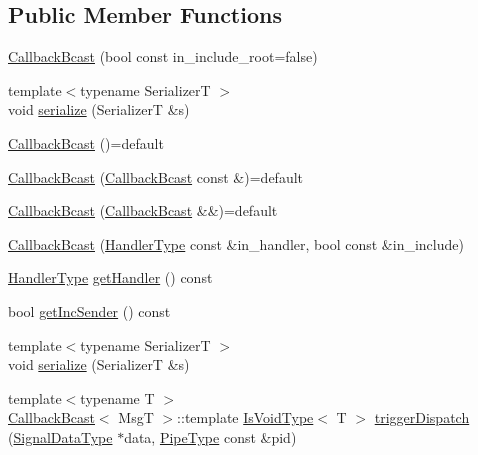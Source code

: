 \subsection*{Public Member Functions}
\begin{DoxyCompactItemize}
\item 
\hyperlink{structvt_1_1pipe_1_1callback_1_1_callback_bcast_acfc9a64a9f4d26b1bac0d2ba5a6b3b58}{Callback\+Bcast} (bool const in\+\_\+include\+\_\+root=false)
\item 
{\footnotesize template$<$typename SerializerT $>$ }\\void \hyperlink{structvt_1_1pipe_1_1callback_1_1_callback_bcast_a2337a0d2bda968f7ab1e4c85c3dbe67a}{serialize} (SerializerT \&s)
\item 
\hyperlink{structvt_1_1pipe_1_1callback_1_1_callback_bcast_adbfcc31e986a2aed709b8517e0e978ae}{Callback\+Bcast} ()=default
\item 
\hyperlink{structvt_1_1pipe_1_1callback_1_1_callback_bcast_a7a711d532fcf9c8c91ab984e9848e2f0}{Callback\+Bcast} (\hyperlink{structvt_1_1pipe_1_1callback_1_1_callback_bcast}{Callback\+Bcast} const \&)=default
\item 
\hyperlink{structvt_1_1pipe_1_1callback_1_1_callback_bcast_af90721bd868d3d3e4140db4bee5da39f}{Callback\+Bcast} (\hyperlink{structvt_1_1pipe_1_1callback_1_1_callback_bcast}{Callback\+Bcast} \&\&)=default
\item 
\hyperlink{structvt_1_1pipe_1_1callback_1_1_callback_bcast_a7a1ad4445c17e0da91a128ac0b0cdde1}{Callback\+Bcast} (\hyperlink{namespacevt_af64846b57dfcaf104da3ef6967917573}{Handler\+Type} const \&in\+\_\+handler, bool const \&in\+\_\+include)
\item 
\hyperlink{namespacevt_af64846b57dfcaf104da3ef6967917573}{Handler\+Type} \hyperlink{structvt_1_1pipe_1_1callback_1_1_callback_bcast_a7585164f2854f2af3f23af0e0468e0c8}{get\+Handler} () const
\item 
bool \hyperlink{structvt_1_1pipe_1_1callback_1_1_callback_bcast_a44fca909dc3216da6c84a6277649fa6e}{get\+Inc\+Sender} () const
\item 
{\footnotesize template$<$typename SerializerT $>$ }\\void \hyperlink{structvt_1_1pipe_1_1callback_1_1_callback_bcast_a1eadd931f74a579b9ec5830006aaf32c}{serialize} (SerializerT \&s)
\item 
{\footnotesize template$<$typename T $>$ }\\\hyperlink{structvt_1_1pipe_1_1callback_1_1_callback_bcast}{Callback\+Bcast}$<$ MsgT $>$\+::template \hyperlink{structvt_1_1pipe_1_1callback_1_1_callback_bcast_a3ca08c23824cfac76b837311a1d2c929}{Is\+Void\+Type}$<$ T $>$ \hyperlink{structvt_1_1pipe_1_1callback_1_1_callback_bcast_aa5c6f297ec676eb2dda4d4b6238fa282}{trigger\+Dispatch} (\hyperlink{structvt_1_1pipe_1_1callback_1_1_callback_bcast_aaf994b71056001334d30d74fa9c958f9}{Signal\+Data\+Type} $\ast$data, \hyperlink{namespacevt_ac9852acda74d1896f48f406cd72c7bd3}{Pipe\+Type} const \&pid)

\end{DoxyCompactItemize}
